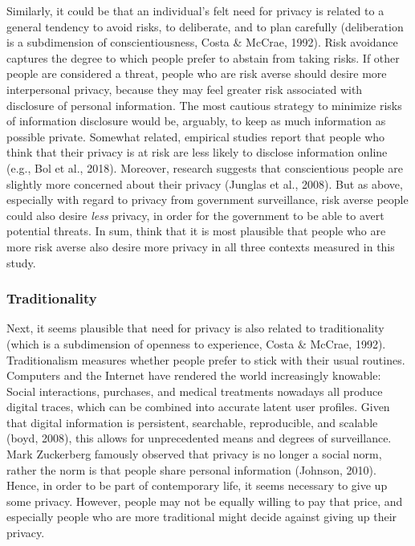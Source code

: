 \documentclass[man,floatsintext]{apa6}
\begin{document}
Similarly, it could be that an individual's felt need for privacy is related to a general tendency to avoid risks, to deliberate, and to plan carefully (deliberation is a subdimension of conscientiousness, Costa \& McCrae, 1992). Risk avoidance captures the degree to which people prefer to abstain from taking risks. If other people are considered a threat, people who are risk averse should desire more interpersonal privacy, because they may feel greater risk associated with disclosure of personal information. The most cautious strategy to minimize risks of information disclosure would be, arguably, to keep as much information as possible private. Somewhat related, empirical studies report that people who think that their privacy is at risk are less likely to disclose information online (e.g., Bol et al., 2018). Moreover, research suggests that conscientious people are slightly more concerned about their privacy (Junglas et al., 2008). But as above, especially with regard to privacy from government surveillance, risk averse people could also desire \emph{less} privacy, in order for the government to be able to avert potential threats. In sum, think that it is most plausible that people who are more risk averse also desire more privacy in all three contexts measured in this study.

\hypertarget{traditionality}{%
\subsubsection{Traditionality}\label{traditionality}}

Next, it seems plausible that need for privacy is also related to traditionality (which is a subdimension of openness to experience, Costa \& McCrae, 1992). Traditionalism measures whether people prefer to stick with their usual routines. Computers and the Internet have rendered the world increasingly knowable: Social interactions, purchases, and medical treatments nowadays all produce digital traces, which can be combined into accurate latent user profiles. Given that digital information is persistent, searchable, reproducible, and scalable (boyd, 2008), this allows for unprecedented means and degrees of surveillance. Mark Zuckerberg famously observed that privacy is no longer a social norm, rather the norm is that people share personal information (Johnson, 2010). Hence, in order to be part of contemporary life, it seems necessary to give up some privacy. However, people may not be equally willing to pay that price, and especially people who are more traditional might decide against giving up their privacy.
\end{document}

